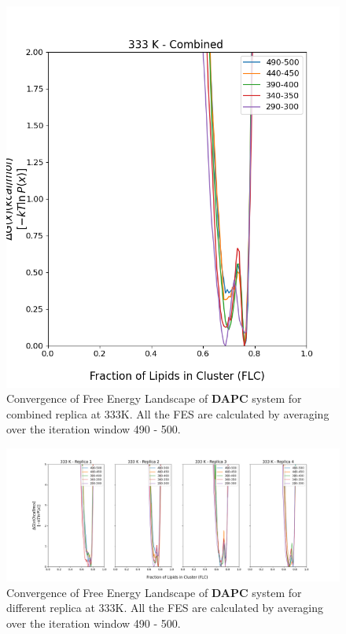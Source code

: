 \documentclass{biophys-new}
\begin{document}
\begin{figure}[hbt!]
\centering
\includegraphics[width=0.6\linewidth]{all_plots/ClusterLipids2Total/DPPC_DAPC_CHOL/333K/Convergence_DAPC_MULTI__333_ClusterLipids2Total.png}
\caption{Convergence of Free Energy Landscape of \textbf{DAPC} system for combined replica at 333K. All the FES are calculated by averaging over the iteration window 490 - 500.}
\label{fig:view}

\end{figure}

\begin{figure}[hbt!]
\centering
\includegraphics[width=1.1\linewidth]{all_plots/ClusterLipids2Total/DPPC_DAPC_CHOL/333K/Convergence_DAPC_333_ClusterLipids2Total.png}
\caption{Convergence of Free Energy Landscape of \textbf{DAPC} system for different replica at 333K. All the FES are calculated by averaging over the iteration window 490 - 500.}
\label{fig:view}

\end{figure}
\end{document}
